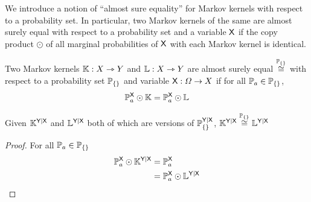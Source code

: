 We introduce a notion of ``almost sure equality'' for Markov kernels with respect to a probability set. In particular, two Markov kernels of the same are almost surely equal with respect to a probability set and a variable $\mathsf{X}$ if the copy product $\odot$ of all marginal probabilities of $\mathsf{X}$ with each Markov kernel is identical.

\begin{definition}\label{def:asequal}
Two Markov kernels $\mathbb{K}:X\rightarrowtriangle Y$ and $\mathbb{L}:X\rightarrowtriangle Y$ are almost surely equal $\overset{\mathbb{P}_{\{\}}}{\cong}$ with respect to a probability set $\mathbb{P}_{\{\}}$ and variable $\mathsf{X}:\Omega\to X$ if for all $\mathbb{P}_a \in \mathbb{P}_{\{\}}$,
\begin{align}
	\mathbb{P}^{\mathsf{X}}_a\odot \mathbb{K}=\mathbb{P}^{\mathsf{X}}_a\odot \mathbb{L}
\end{align}
\end{definition}

\begin{lemma}
Given $\mathbb{K}^{\mathsf{Y}|\mathsf{X}}$ and $\mathbb{L}^{\mathsf{Y}|\mathsf{X}}$ both of which are versions of $\mathbb{P}_{\{\}}^{\mathsf{Y}|\mathsf{X}}$, $\mathbb{K}^{\mathsf{Y}|\mathsf{X}}\overset{\mathbb{P}_{\{\}}}{\cong}\mathbb{L}^{\mathsf{Y}|\mathsf{X}}$
\end{lemma}

\begin{proof}
For all $\mathbb{P}_a \in \mathbb{P}_{\{\}}$
\begin{align}
	\mathbb{P}^{\mathsf{X}}_a\odot \mathbb{K}^{\mathsf{Y}|\mathsf{X}} &= \mathbb{P}^{\mathsf{X}}_a\\
	&= \mathbb{P}^{\mathsf{X}}_a\odot \mathbb{L}^{\mathsf{Y}|\mathsf{X}}
\end{align}
\end{proof}





